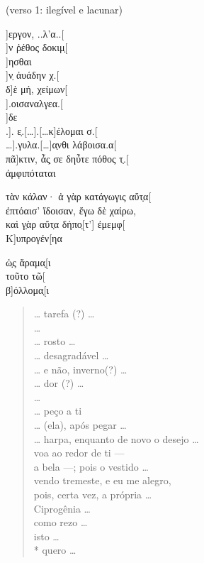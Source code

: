 \begin{gkverse}
\textnormal{(verso 1: ilegível e lacunar)}

]εργον, ..λ’α..[\\
  ]ν ῤέθος δοκιμ̣[\\
    ]ησθαι\\
]ν̣ ἀυάδην χ.[\\
δ]ὲ μή, χείμων[\\
  ].οισαναλγεα.[\\
  ]δε\\
.]. ε̣.[\ldots{}].[\ldots{}κ]έλομαι σ.[\\
\ldots{}].γυλα.[\ldots{}]α̣νθι λάβοισα.α[\\
πᾶ]κτιν, ἆς̣ σε δηὖτε πόθος τ̣.[\\
ἀμφιπόταται

τὰν κάλαν· ἀ γὰρ κατάγωγις αὔτ̣α[\\
ἐπτόαισ’ ἴδοισαν, ἔγω δὲ χαίρω,\\
καὶ γ̣ὰρ αὔτ̣α δήπο̣[τ’] ἐμεμφ[\\
Κ]υπρογέν[ηα

ὠ̣ς ἄραμα̣[ι\\
τοῦτο τῶ[\\
β]όλλομα̣[ι

\end{gkverse}


\begin{verse}
\ldots{} tarefa (?) \ldots{}\\
\ldots{}\\ 
\ldots{}  rosto \ldots{}\\  
\ldots{}  desagradável \ldots{}\\
\ldots{}  e não, inverno(?) \ldots{}\\
\ldots{}  dor (?) \ldots{}\\
\ldots{}\\ 
\ldots{}  peço a ti\\
\ldots{}  (ela), após pegar \ldots{}\\
\ldots{} harpa, enquanto de novo o desejo \ldots{}\\
voa ao redor de ti ---\\
a bela ---; pois o vestido \ldots{}\\
vendo tremeste, e eu me alegro,\\
pois, certa vez, a própria \ldots{} \\
Ciprogênia \ldots{}\\
como rezo \ldots{}\\
isto \ldots{}\\*
quero \ldots{}\\
\end{verse}

